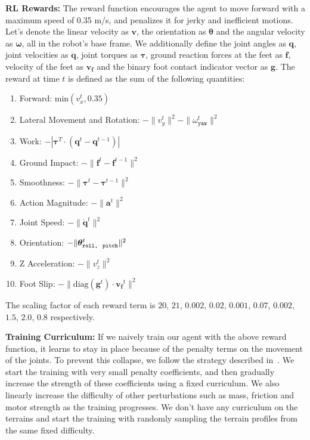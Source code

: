 \documentclass[conference]{IEEEtran}
\begin{document}
\vspace{0.6em}\noindent\textbf{RL Rewards:} \label{subsubsec:rlrewards} The reward function encourages the agent to move forward with a maximum speed of 0.35 m/s, and penalizes it for jerky and inefficient motions. Let's denote the linear velocity as $\mathbf{v}$, the orientation as $\bm{\theta}$ and the angular velocity as $\bm{\omega}$, all in the robot's base frame. We additionally define the joint angles as $\mathbf{q}$, joint velocities as $\dot{\mathbf{q}}$, joint torques as $\bm{\tau}$, ground reaction forces at the feet as $\mathbf{f}$, velocity of the feet as $\mathbf{v_f}$ and the binary foot contact indicator vector as $\mathbf{g}$. The reward at time $t$ is defined as the sum of the following quantities:
\begin{enumerate}
    \item Forward: min$(v^t_x, 0.35)$ 
    \item Lateral Movement and Rotation: $- \|v^t_y\|^2 - \|\omega^t_{\texttt{yaw}}\|^2$
    \item Work: $-|\bm{\tau}^T \cdot (\mathbf{q}^t - \mathbf{q}^{t-1})|$
    \item Ground Impact: $-\|\mathbf{f}^t - \mathbf{f}^{t-1}\|^2$ 
    \item Smoothness: $-\| \bm{\tau}^{t} - \bm{\tau}^{t-1} \|^2$
    \item Action Magnitude: $- \|\mathbf{a}^t\|^2$
    \item Joint Speed: $- \|\dot{\mathbf{q}}^t\|^2$
    \item Orientation: $- \|\bm{\theta}^t_{\texttt{roll,\; pitch}}\|^2$
    \item Z Acceleration: $- \|v^t_z\|^2$
    \item Foot Slip:  $-\|\text{diag}(\mathbf{g}^t) \cdot \mathbf{v_f}^t\|^2$ 
\end{enumerate}
The scaling factor of each reward term is $20$, $21$, $0.002$, $0.02$, $0.001$, $0.07$, $0.002$, $1.5$, $2.0$, $0.8$ respectively. 

\vspace{0.6em}\noindent\textbf{Training Curriculum: } If we naively train our agent with the above reward function, it learns to stay in place because of the penalty terms on the movement of the joints. To prevent this collapse, we follow the strategy described in~\cite{hwangbo2019learning}. We start the training with very small penalty coefficients, and then gradually increase the strength of these coefficients using a fixed curriculum. We also linearly increase the difficulty of other perturbations such as mass, friction and motor strength as the training progresses. We don't have any curriculum on the terrains and start the training with randomly sampling the terrain profiles from the same fixed difficulty. 
\end{document}
